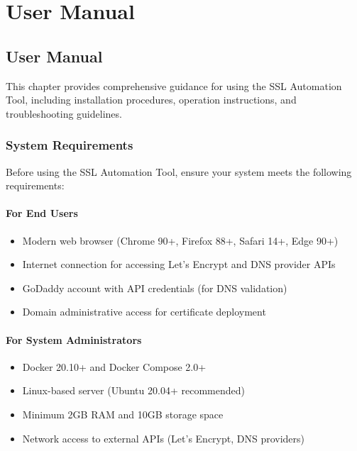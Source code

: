 
\chapter{User Manual}\doublespacing %

\label{Chapter4} %



\section{User Manual}

This chapter provides comprehensive guidance for using the SSL Automation Tool, including installation procedures, operation instructions, and troubleshooting guidelines.

\subsection{System Requirements}

Before using the SSL Automation Tool, ensure your system meets the following requirements:

\subsubsection{For End Users}
\begin{itemize}
    \item Modern web browser (Chrome 90+, Firefox 88+, Safari 14+, Edge 90+)
    \item Internet connection for accessing Let's Encrypt and DNS provider APIs
    \item GoDaddy account with API credentials (for DNS validation)
    \item Domain administrative access for certificate deployment
\end{itemize}

\subsubsection{For System Administrators}
\begin{itemize}
    \item Docker 20.10+ and Docker Compose 2.0+
    \item Linux-based server (Ubuntu 20.04+ recommended)
    \item Minimum 2GB RAM and 10GB storage space
    \item Network access to external APIs (Let's Encrypt, DNS providers)
\end{itemize}

